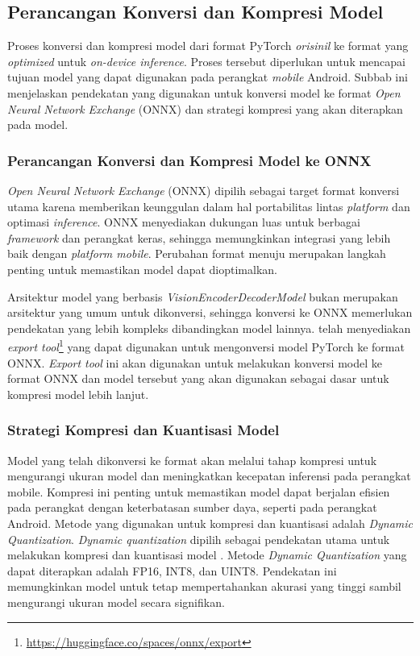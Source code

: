 \subsection{Perancangan Konversi dan Kompresi Model}
\label{subsec:perancangan-konversi-dan-kompresi-model}

 Proses konversi dan kompresi model \donut{} dari format PyTorch \emph{orisinil} ke format yang \emph{optimized} untuk \emph{on-device inference}. Proses tersebut diperlukan untuk mencapai tujuan model yang dapat digunakan pada perangkat \emph{mobile} Android. Subbab ini menjelaskan pendekatan yang digunakan untuk konversi model ke format \emph{Open Neural Network Exchange} (ONNX) dan strategi kompresi yang akan diterapkan pada model.

\subsubsection{Perancangan Konversi dan Kompresi Model \donut{} ke ONNX}
\label{subsubsec:strategi-konversi-onnx}

\emph{Open Neural Network Exchange} (ONNX) dipilih sebagai target format konversi utama karena memberikan keunggulan dalam hal portabilitas lintas \emph{platform} dan optimasi \emph{inference}. ONNX menyediakan dukungan luas untuk berbagai \emph{framework} dan perangkat keras, sehingga memungkinkan integrasi yang lebih baik dengan \emph{platform mobile}. Perubahan format menuju \onnx{} merupakan langkah penting untuk memastikan model dapat dioptimalkan.

Arsitektur model \donut{} yang berbasis \textit{VisionEncoderDecoderModel} bukan merupakan arsitektur yang umum untuk dikonversi, sehingga konversi ke ONNX memerlukan pendekatan yang lebih kompleks dibandingkan model lainnya. \onnx{} telah menyediakan \emph{export tool}{}\footnote{\url{https://huggingface.co/spaces/onnx/export}} yang dapat digunakan untuk mengonversi model PyTorch ke format ONNX. \emph{Export tool} ini akan digunakan untuk melakukan konversi model \donut{} ke format ONNX dan model tersebut yang akan digunakan sebagai dasar untuk kompresi model lebih lanjut. 

\subsubsection{Strategi Kompresi dan Kuantisasi Model}
\label{subsubsec:strategi-kompresi-dan-kuantisasi-model}

Model \donut{} yang telah dikonversi ke format \onnx{} akan melalui tahap kompresi untuk mengurangi ukuran model dan meningkatkan kecepatan inferensi pada perangkat mobile. Kompresi ini penting untuk memastikan model dapat berjalan efisien pada perangkat dengan keterbatasan sumber daya, seperti pada perangkat Android. Metode yang digunakan untuk kompresi dan kuantisasi adalah \emph{Dynamic Quantization}. \emph{Dynamic quantization} dipilih sebagai pendekatan utama untuk melakukan kompresi dan kuantisasi model \donut. Metode \emph{Dynamic Quantization} yang dapat diterapkan adalah FP16, INT8, dan UINT8. Pendekatan ini memungkinkan model untuk tetap mempertahankan akurasi yang tinggi sambil mengurangi ukuran model secara signifikan.
